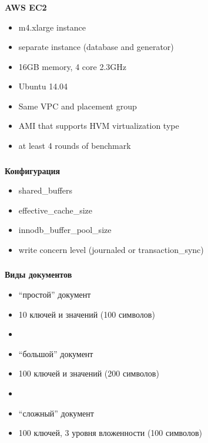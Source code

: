 \documentclass[usenames,dvipsnames, 18pt, compress, aspectratio=169]{beamer}
\begin{document}
\begin{frame}
    \frametitle{}
    \begin{center}
        \textbf{AWS EC2}
        \begin{itemize}[label={}]
            \item m4.xlarge instance
            \item separate instance (database and generator)
            \item 16GB memory, 4 core 2.3GHz
            \item Ubuntu 14.04
            \item Same VPC and placement group
            \item AMI that supports HVM virtualization type
            \item at least 4 rounds of benchmark
        \end{itemize}
    \end{center}
\end{frame}

\begin{frame}
    \frametitle{}
    \begin{center}
        \textbf{Конфигурация}
        \begin{itemize}[label={}]
            \item shared\_buffers
            \item effective\_cache\_size
            \item innodb\_buffer\_pool\_size
            \item write concern level (journaled or transaction\_sync)
        \end{itemize}
    \end{center}
\end{frame}

\begin{frame}
    \frametitle{}
    \begin{center}
        \textbf{Виды документов}
        \begin{itemize}[label={}]
            \item “простой” документ
            \item 10 ключей и значений (100 символов)
            \item 
            \item “большой” документ
            \item 100 ключей и значений (200 символов)
            \item 
            \item “сложный” документ
            \item 100 ключей, 3 уровня вложенности (100 символов)
        \end{itemize}
    \end{center}
\end{frame}
\end{document}
